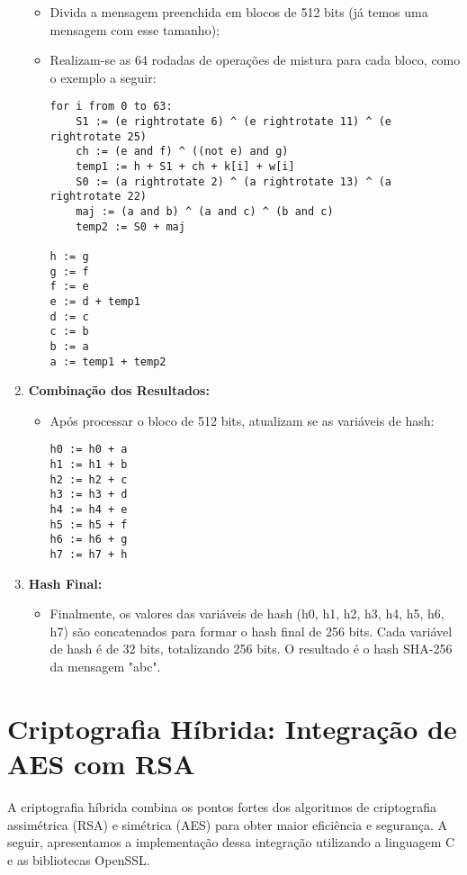 \documentclass[a4paper,12pt]{article}
\begin{document}
\begin{enumerate}
\begin{itemize}
            \item Divida a mensagem preenchida em blocos de 512 bits (já temos uma mensagem com esse tamanho);
            \item Realizam-se as 64 rodadas de operações de mistura para cada bloco, como o exemplo a seguir:
            \begin{lstlisting}
for i from 0 to 63:
    S1 := (e rightrotate 6) ^ (e rightrotate 11) ^ (e rightrotate 25)
    ch := (e and f) ^ ((not e) and g)
    temp1 := h + S1 + ch + k[i] + w[i]
    S0 := (a rightrotate 2) ^ (a rightrotate 13) ^ (a rightrotate 22)
    maj := (a and b) ^ (a and c) ^ (b and c)
    temp2 := S0 + maj

h := g
g := f
f := e
e := d + temp1
d := c
c := b
b := a
a := temp1 + temp2
            \end{lstlisting}
        \end{itemize}
    \item \textbf{Combinação dos Resultados:}
        \begin{itemize}
            \item Após processar o bloco de 512 bits, atualizam se as variáveis de hash:
            \begin{lstlisting}
h0 := h0 + a
h1 := h1 + b
h2 := h2 + c
h3 := h3 + d
h4 := h4 + e
h5 := h5 + f
h6 := h6 + g
h7 := h7 + h
            \end{lstlisting}
        \end{itemize}
    \item \textbf{Hash Final:}
        \begin{itemize}
            \item Finalmente, os valores das variáveis de hash (h0, h1, h2, h3, h4, h5, h6, h7) são concatenados para formar o hash final de 256 bits. Cada variável de hash é de 32 bits, totalizando 256 bits. O resultado é o hash SHA-256 da mensagem "abc".
        \end{itemize}
\end{enumerate}

\section*{Criptografia Híbrida: Integração de AES com RSA}
A criptografia híbrida combina os pontos fortes dos algoritmos de criptografia assimétrica (RSA) e simétrica (AES) para obter maior eficiência e segurança. A seguir, apresentamos a implementação dessa integração utilizando a linguagem C e as bibliotecas OpenSSL.
\end{document}
